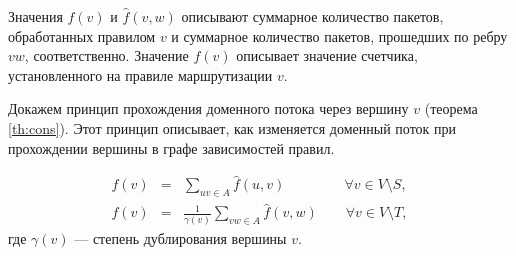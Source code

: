 \documentclass[../thesis.tex]{subfiles}
\begin{document}
Значения $f(v)$ и $\hat{f}(v,w)$ описывают суммарное количество пакетов, обработанных правилом $v$ и суммарное количество пакетов, прошедших по ребру $vw$, соответственно.
Значение $f(v)$ описывает значение счетчика, установленного на правиле маршрутизации $v$.

Докажем принцип прохождения доменного потока через вершину $v$ (теорема \ref{th:cons}).
Этот принцип описывает, как изменяется доменный поток при прохождении вершины в графе зависимостей правил.

\begin{theorem} \label{th:cons}
\begin{eqnarray}
    f(v) & = & \sum_{uv\in A} {\hat{f}(u,v)}\qquad\qquad\ \forall v\in V\setminus S \label{eq:cons_in},\\
    f(v) & = & \frac{1}{\gamma(v)} \sum_{vw\in A} {\hat{f}(v,w)}\qquad \forall v\in V\setminus T \label{eq:cons_out},
\end{eqnarray}
где $\gamma(v)$ --- степень дублирования вершины $v$.
\end{theorem}
\end{document}
